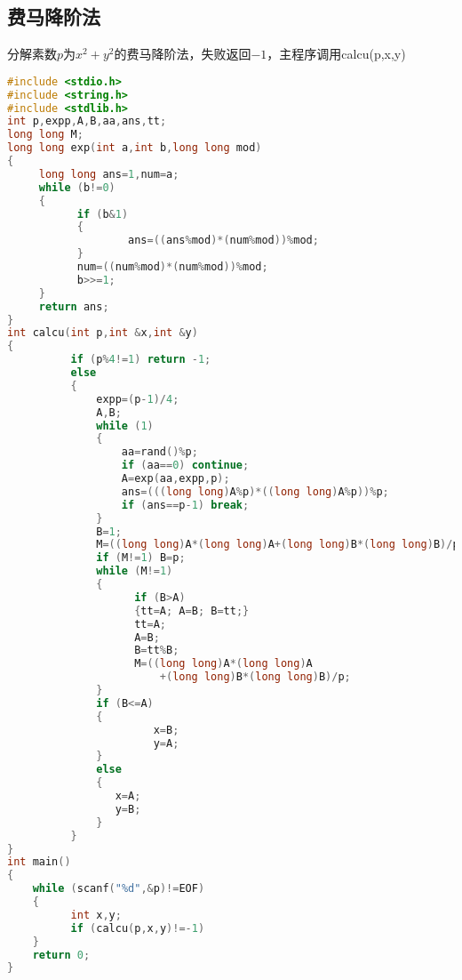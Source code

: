 \subsection{费马降阶法}
	分解素数$p$为$x^2+y^2$的费马降阶法，失败返回$-1$，主程序调用calcu(p,x,y)
	\begin{lstlisting}[language=c++]
#include <stdio.h>
#include <string.h>
#include <stdlib.h>
int p,expp,A,B,aa,ans,tt;
long long M;
long long exp(int a,int b,long long mod)
{
	 long long ans=1,num=a;
	 while (b!=0)
	 {
		   if (b&1)
		   {
				   ans=((ans%mod)*(num%mod))%mod;
		   }
		   num=((num%mod)*(num%mod))%mod;
		   b>>=1;
	 }
	 return ans;
}
int calcu(int p,int &x,int &y)
{
		  if (p%4!=1) return -1;
		  else
		  {
			  expp=(p-1)/4;
			  A,B;
			  while (1)
			  {
				  aa=rand()%p;
				  if (aa==0) continue;
				  A=exp(aa,expp,p);
				  ans=(((long long)A%p)*((long long)A%p))%p;
				  if (ans==p-1) break;
			  }
			  B=1;
			  M=((long long)A*(long long)A+(long long)B*(long long)B)/p;
			  if (M!=1) B=p;
			  while (M!=1)
			  {
					if (B>A)
					{tt=A; A=B; B=tt;}
					tt=A;
					A=B;
					B=tt%B;
					M=((long long)A*(long long)A
						+(long long)B*(long long)B)/p;
			  }
			  if (B<=A)
			  {
					   x=B;
					   y=A;
			  }
			  else
			  {
				 x=A;
				 y=B;
			  }
		  }
}
int main()
{
	while (scanf("%d",&p)!=EOF)
	{
		  int x,y;
		  if (calcu(p,x,y)!=-1)
	}
	return 0;
}
	\end{lstlisting}